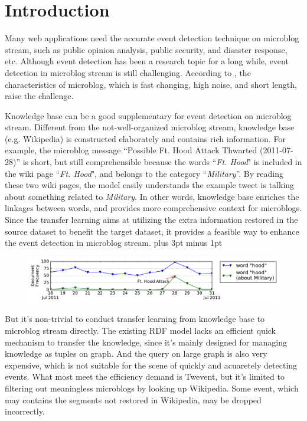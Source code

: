 \documentclass[runningheads,a4paper]{llncs}
\begin{document}
\section{Introduction}
Many web applications need the accurate event detection technique on microblog stream, such as public opinion analysis\cite{thelwall2011sentiment}, public security\cite{Li:2012gw}, and disaster response\cite{Yin:2012ht}, etc.
Although event detection has been a research topic for a long while\cite{allan1998topic}, event detection in microblog stream is still challenging\cite{atefeh2015survey}.
According to \cite{huang2016probabilistic}, the characteristics of microblog, which is fast changing, high noise, and short length, raise the challenge.

Knowledge base can be a good supplementary for event detection on microblog stream.
Different from the not-well-organized microblog stream, knowledge base (e.g. Wikipedia) is constructed elaborately and contains rich information. 
For example, the microblog message ``Possible Ft. Hood Attack Thwarted (2011-07-28)'' is short, but still comprehensible because the words ``\textit{Ft. Hood}" is included in the wiki page ``\textit{Ft. Hood}", and belongs to the category ``\textit{Military}''.
By reading these two wiki pages, the model easily understands the example tweet is talking about something related to \textit{Military}.
In other words, knowledge base enriches the linkages between words, and provides more comprehensive context for microblogs.
Since the transfer learning\cite{pan2010survey} aims at utilizing the extra information restored in the source dataset to benefit the target dataset, it provides a feasible way to enhance the event detection in microblog stream.
\intextsep=3pt plus 3pt minus 1pt
\begin{figure}[h]
        \centering
        \includegraphics[width=1.0\columnwidth]{img/hood.pdf}
        \label{fig:hood}
\end{figure}



But it's non-trivial to conduct transfer learning from knowledge base to microblog stream directly.
The existing RDF model\cite{klyne2006rdf} lacks an efficient quick mechanism to transfer the knowledge, since it's mainly designed for managing knowledge as tuples on graph. And the query on large graph is also very expensive\cite{huang2011scalable}, which is not suitable for the scene of quickly and acuaretely detecting events.
What most meet the efficiency demand is Twevent\cite{Twevent2012}, but it's limited to filtering out meaningless microblogs by looking up Wikipedia. Some event,  which may contains the segments not restored in Wikipedia, may be dropped incorrectly.
\end{document}
